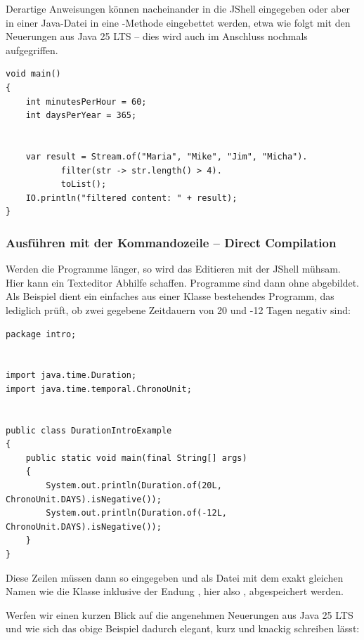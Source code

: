 Derartige Anweisungen können nacheinander in die JShell eingegeben oder aber in einer
Java-Datei in eine -Methode eingebettet werden, etwa wie folgt
mit den Neuerungen aus Java 25 LTS -- dies wird auch im Anschluss nochmals aufgegriffen.


\vspace{-0.75mm}
\begin{lstlisting}
void main()
{
    int minutesPerHour = 60;
    int daysPerYear = 365;


    var result = Stream.of("Maria", "Mike", "Jim", "Micha").
           filter(str -> str.length() > 4).
           toList();
    IO.println("filtered content: " + result);
}
\end{lstlisting}
\vspace{-0.75mm}


\subsubsection{Ausführen mit der Kommandozeile -- Direct Compilation}


Werden die Programme länger, so wird das Editieren mit der JShell mühsam.
Hier kann ein Texteditor Abhilfe schaffen. Programme sind dann ohne  
abgebildet.
Als Beispiel dient ein einfaches aus einer Klasse bestehendes Programm,
das  lediglich prüft, ob zwei gegebene Zeitdauern von 20 und -12 Tagen negativ sind:


\vspace{-0.75mm}
\begin{lstlisting}
package intro;


import java.time.Duration;
import java.time.temporal.ChronoUnit;


public class DurationIntroExample
{
    public static void main(final String[] args)
    {
        System.out.println(Duration.of(20L, ChronoUnit.DAYS).isNegative());
        System.out.println(Duration.of(-12L, ChronoUnit.DAYS).isNegative());
    }
}
\end{lstlisting}
\vspace{-0.75mm}


Diese Zeilen müssen dann so eingegeben und als Datei mit dem exakt gleichen
Namen wie die Klasse inklusive der Endung , hier also
,
abgespeichert werden.


Werfen wir einen kurzen Blick auf die angenehmen Neuerungen aus Java 25 LTS
und wie sich das obige Beispiel dadurch elegant, kurz und knackig schreiben lässt:


